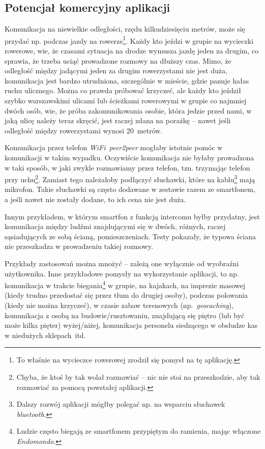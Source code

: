 \documentclass[a4paper,titlepage]{article}
\theoremstyle{break}
\begin{document}

\subsection{Potencjał komercyjny aplikacji}

Komunikacja na niewielkie odległości, rzędu kilkudziesięciu metrów, może się przydać np. podczas jazdy na rowerze\footnote{To właśnie na wycieczce rowerowej zrodził się pomysł na tę aplikację.}. Każdy kto jeździ w grupie na wycieczki rowerowe, wie, że czasami sytuacja na drodze wymusza jazdę jeden za drugim, co sprawia, że trzeba uciąć prowadzone rozmowy na dłuższy czas. Mimo, że odległość między jadącymi jeden za drugim rowerzystami nie jest duża, komunikacja jest bardzo utrudniona, szczególnie w mieście, gdzie panuje hałas ruchu ulicznego. Można co prawda próbować krzyczeć, ale każdy kto jeździł szybko warszawskimi ulicami lub ścieżkami rowerowymi w grupie co najmniej dwóch osób, wie, że próba zakomunikowania osobie, która jedzie przed nami, w jaką ulicę należy teraz skręcić, jest raczej zdana na porażkę -- nawet jeśli odległość między rowerzystami wynosi 20~metrów.

Komunikacja przez telefon \emph{WiFi~peer2peer} mogłaby istotnie pomóc w komunikacji w takim wypadku. Oczywiście komunikacja nie byłaby prowadzona w taki sposób, w jaki zwykle rozmawiamy przez telefon, tzn. trzymając telefon przy uchu\footnote{Chyba, że ktoś by tak wolał rozmawiać -- nic nie stoi na przeszkodzie, aby tak rozmawiać za pomocą powstałej aplikacji.}. Zamiast tego należałoby podłączyć słuchawki, które na kablu\footnote{Dalszy rozwój aplikacji mógłby polegać np. na wsparciu słuchawek \emph{bluetooth}.} mają mikrofon. Takie słuchawki są często dodawane w zestawie razem ze smartfonem, a jeśli nawet nie zostały dodane, to ich cena nie jest duża.

Innym przykładem, w którym smartfon z funkcją intercomu byłby przydatny, jest komunikacja między ludźmi znajdującymi się w dwóch, różnych, raczej sąsiadujących ze sobą ścianą, pomieszczeniach. Testy pokazały, że typowa ściana nie przeszkadza w prowadzeniu takiej rozmowy.

Przykłady zastosowań można mnożyć -- zależą one wyłącznie od wyobraźni użytkownika. Inne przykładowe pomysły na wykorzystanie aplikacji, to np. komunikacja w trakcie biegania\footnote{Ludzie często biegają ze smartfonem przypiętym do ramienia, mając włączone \emph{Endomondo}.} w grupie, na kajakach, na imprezie masowej (kiedy trudno przedostać się przez tłum do drugiej osoby), podczas polowania (kiedy nie można krzyczeć), w czasie zabaw terenowych (np.~\emph{geocaching}), komunikacja z osobą na budowie/rusztowaniu, znajdującą się piętro (lub być może kilka pięter) wyżej/niżej, komunikacja personelu siedzącego w obsłudze kas w niedużych sklepach~itd.
\end{document}
